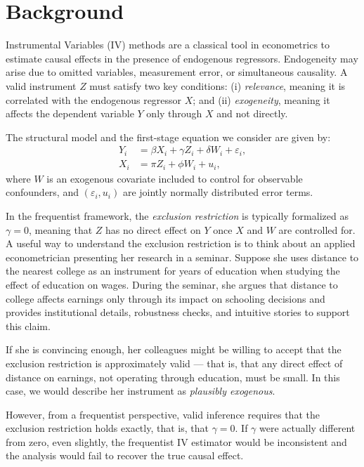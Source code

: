 \section{Background}

Instrumental Variables (IV) methods are a classical tool in econometrics to estimate causal effects in the presence of endogenous regressors. Endogeneity may arise due to omitted variables, measurement error, or simultaneous causality. A valid instrument \( Z \) must satisfy two key conditions: (i) \emph{relevance}, meaning it is correlated with the endogenous regressor \( X \); and (ii) \emph{exogeneity}, meaning it affects the dependent variable \( Y \) only through \( X \) and not directly.

The structural model and the first-stage equation we consider are given by:
\begin{align}
    Y_i &= \beta X_i + \gamma Z_i + \delta W_i + \varepsilon_i, \\
    X_i &= \pi Z_i + \phi W_i + u_i,
\end{align}
where \( W \) is an exogenous covariate included to control for observable confounders, and \( (\varepsilon_i, u_i) \) are jointly normally distributed error terms.

In the frequentist framework, the \emph{exclusion restriction} is typically formalized as \( \gamma = 0 \), meaning that \( Z \) has no direct effect on \( Y \) once \( X \) and \( W \) are controlled for. A useful way to understand the exclusion restriction is to think about an applied econometrician presenting her research in a seminar. Suppose she uses distance to the nearest college as an instrument for years of education when studying the effect of education on wages. During the seminar, she argues that distance to college affects earnings only through its impact on schooling decisions and provides institutional details, robustness checks, and intuitive stories to support this claim.

If she is convincing enough, her colleagues might be willing to accept that the exclusion restriction is approximately valid --- that is, that any direct effect of distance on earnings, not operating through education, must be small. In this case, we would describe her instrument as \emph{plausibly exogenous}.

However, from a frequentist perspective, valid inference requires that the exclusion restriction holds exactly, that is, that $\gamma = 0$. If $\gamma$ were actually different from zero, even slightly, the frequentist IV estimator would be inconsistent and the analysis would fail to recover the true causal effect.

